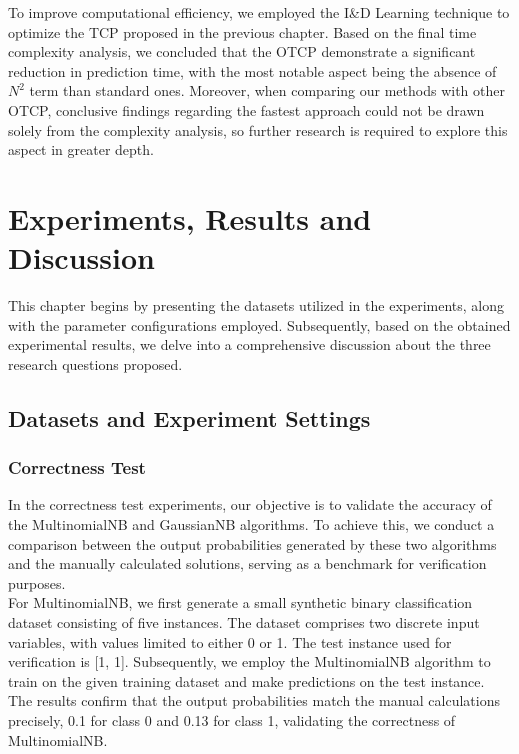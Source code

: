 \documentclass[10pt]{reportMaster}
\begin{document}
To improve computational efficiency, we employed the I\&D Learning technique to optimize the TCP proposed in the previous chapter. Based on the final time complexity analysis, we concluded that the OTCP demonstrate a significant reduction in prediction time, with the most notable aspect being the absence of $N^2$ term than standard ones. Moreover, when comparing our methods with other OTCP, conclusive findings regarding the fastest approach could not be drawn solely from the complexity analysis, so further research is required to explore this aspect in greater depth.

\chapter{Experiments, Results and Discussion}

This chapter begins by presenting the datasets utilized in the experiments, along with the parameter configurations employed. Subsequently, based on the obtained experimental results, we delve into a comprehensive discussion about the three research questions proposed.

\section{Datasets and Experiment Settings}
\subsection{Correctness Test}
In the correctness test experiments, our objective is to validate the accuracy of the MultinomialNB and GaussianNB algorithms. To achieve this, we conduct a comparison between the output probabilities generated by these two algorithms and the manually calculated solutions, serving as a benchmark for verification purposes.\\

\noindent For MultinomialNB, we first generate a small synthetic binary classification dataset consisting of five instances. The dataset comprises two discrete input variables, with values limited to either 0 or 1. The test instance used for verification is [1, 1]. Subsequently, we employ the MultinomialNB algorithm to train on the given training dataset and make predictions on the test instance. The results confirm that the output probabilities match the manual calculations precisely, 0.1 for class 0 and 0.13 for class 1, validating the correctness of MultinomialNB.\\
\end{document}
